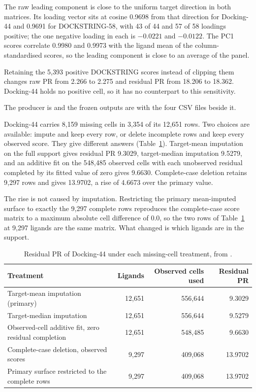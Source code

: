 The raw leading component is close to the uniform target direction in both matrices. Its
loading vector sits at cosine 0.9698 from that direction for Docking-44 and 0.9691 for
DOCKSTRING-58, with 43 of 44 and 57 of 58 loadings positive; the one negative loading in each
is $-0.0221$ and $-0.0122$. The PC1 scores correlate 0.9980 and 0.9973 with the ligand mean of
the column-standardised scores, so the leading component is close to an average of the panel.

Retaining the 5{,}393 positive DOCKSTRING scores instead of clipping them changes raw PR from
2.266 to 2.275 and residual PR from 18.206 to 18.362. Docking-44 holds no positive cell, so it
has no counterpart to this sensitivity.


The producer is  and the frozen
outputs are  with the
four CSV files beside it.

Docking-44 carries 8{,}159 missing cells in 3{,}354 of its 12{,}651 rows. Two choices are
available: impute and keep every row, or delete incomplete rows and keep every observed score.
They give different answers (Table~\ref{tab:s2missing}). Target-mean imputation on the full
support gives residual PR 9.3029, target-median imputation 9.5279, and an additive fit on the
548{,}485 observed cells with each unobserved residual completed by its fitted value of zero
gives 9.6630. Complete-case deletion retains 9{,}297 rows and gives 13.9702, a rise of 4.6673
over the primary value.

The rise is not caused by imputation. Restricting the primary mean-imputed surface to exactly
the 9{,}297 complete rows reproduces the complete-case score matrix to a maximum absolute cell
difference of 0.0, so the two rows of Table~\ref{tab:s2missing} at 9{,}297 ligands are the same
matrix. What changed is which ligands are in the support.

\begin{table}[htbp]
\centering
\caption{Residual PR of Docking-44 under each missing-cell treatment, from
\protect{}.}
\label{tab:s2missing}
\small
\begin{tabular}{lrrr}
\toprule
Treatment & Ligands & Observed cells used & Residual PR \\
\midrule
Target-mean imputation (primary) & 12{,}651 & 556{,}644 & 9.3029 \\
Target-median imputation & 12{,}651 & 556{,}644 & 9.5279 \\
Observed-cell additive fit, zero residual completion & 12{,}651 & 548{,}485 & 9.6630 \\
Complete-case deletion, observed scores & 9{,}297 & 409{,}068 & 13.9702 \\
Primary surface restricted to the complete rows & 9{,}297 & 409{,}068 & 13.9702 \\
\bottomrule
\end{tabular}
\end{table}

